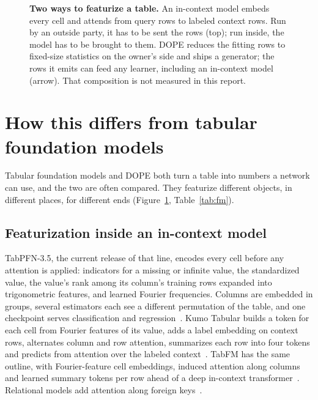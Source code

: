 \documentclass[10pt,letterpaper,twocolumn]{article}
\newcommand{\ct}[1]{{\bfseries\color{ink}#1}}   %
\newcommand{\fsfont}{\sffamily\fontsize{6.6}{8.1}\selectfont}
\newcommand{\fl}[1]{{\sffamily\bfseries\fontsize{7.5}{9}\selectfont\color{ink}#1}}       %
\newcommand{\fs}[1]{{\sffamily\fontsize{6.6}{8.1}\selectfont\color{sub}#1}}              %
\begin{document}
\begin{figure}[t]
\caption{\ct{Two ways to featurize a table.} An in-context model embeds every cell and attends from query rows to labeled context rows. Run by an outside party, it has to be sent the rows (top); run inside, the model has to be brought to them. DOPE reduces the fitting rows to fixed-size statistics on the owner's side and ships a generator; the rows it emits can feed any learner, including an in-context model (arrow). That composition is not measured in this report.}
\label{fig:fm}
\end{figure}
\section{How this differs from tabular foundation models}\label{sec:fm}
Tabular foundation models and DOPE both turn a table into numbers a network can use, and the two are often compared. They featurize different objects, in different places, for different ends (Figure~\ref{fig:fm}, Table~\ref{tab:fm}).

\subsection{Featurization inside an in-context model}
TabPFN-3.5, the current release of that line, encodes every cell before any attention is applied: indicators for a missing or infinite value, the standardized value, the value's rank among its column's training rows expanded into trigonometric features, and learned Fourier frequencies. Columns are embedded in groups, several estimators each see a different permutation of the table, and one checkpoint serves classification and regression~\cite{tabpfn35}. Kumo Tabular builds a token for each cell from Fourier features of its value, adds a label embedding on context rows, alternates column and row attention, summarizes each row into four tokens and predicts from attention over the labeled context~\cite{kumotabular}. TabFM has the same outline, with Fourier-feature cell embeddings, induced attention along columns and learned summary tokens per row ahead of a deep in-context transformer~\cite{tabfm}. Relational models add attention along foreign keys~\cite{kumorfm,kumorfm2}.
\end{document}

